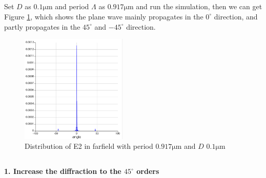\documentclass[fontsize=11pt]{scrartcl}
\begin{document}
\subsection{}
Set $D$ as $0.1\mathrm{\mu m}$ and period $\Lambda$ as $0.917\mathrm{\mu m}$ and 
run the simulation, then we can get Figure \ref{fig1.2}, 
which shows the plane wave mainly propagates in the $0^\circ$ direction, 
and partly propagates in the $45^\circ$ and $-45^\circ$ direction.
\begin{figure}[H]
    \centering
     \includegraphics[width=0.45\textwidth]{img/fig1.2.png}
     \caption{Distribution of E2 in farfield with 
     period $0.917\mathrm{\mu m}$ and $D$ $0.1\mathrm{\mu m}$}
     \label{fig1.2}
\end{figure}
\subsection{}
\textbf{1. Increase the diffraction to the $45^\circ$ orders}
\end{document}
